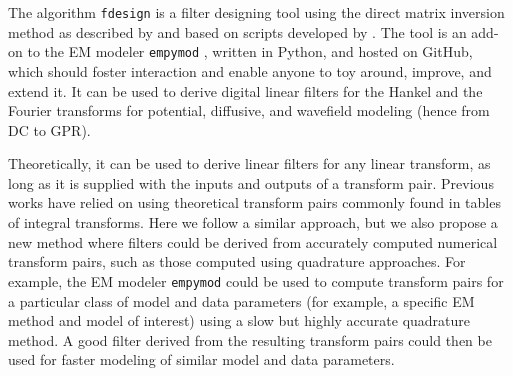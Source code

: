 \documentclass[paper,twocolumn,twoside]{geophysics}
\begin{document}
The algorithm \texttt{fdesign} is a filter designing tool using the direct
matrix inversion method as described by \cite{GP.07.Kong} and based on scripts
developed by \cite{GEO.12.Key}. The tool is an add-on to the EM modeler
\texttt{empymod} \citep{GEO.17.Werthmuller}, written in Python, and hosted on
GitHub, which should foster interaction and enable anyone to toy around,
improve, and extend it. It can be used to derive digital linear filters for the
Hankel and the Fourier transforms for potential, diffusive, and wavefield
modeling (hence from DC to GPR).

Theoretically, it can be used to derive linear filters for any linear
transform, as long as it is supplied with the inputs and outputs of a transform
pair. Previous works have relied on using theoretical transform pairs commonly
found in tables of integral transforms. Here we follow a similar approach, but
we also propose a new method where filters could be derived from accurately
computed numerical transform pairs, such as those computed using quadrature
approaches. For example, the EM modeler \texttt{empymod} could be used to
compute transform pairs for a particular class of model and data parameters
(for example, a specific EM method and model of interest) using a slow but
highly accurate quadrature method. A good filter derived from the resulting
transform pairs could then be used for faster modeling of similar model and
data parameters.
\end{document}
